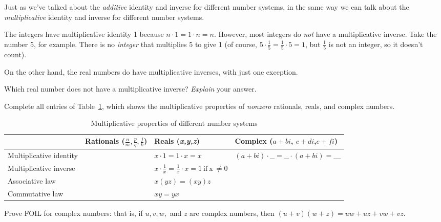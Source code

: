 Just as we've talked about the \emph{additive} identity and inverse
for different number systems, in the same way we can talk about the
\emph{multiplicative} identity and inverse for different number systems.

The integers have multiplicative identity 1 because $n\cdot1=1\cdot n=n$.
However, most integers do \emph{not} have a multiplicative inverse.
Take the number 5, for example. There is no \emph{integer} that multiplies
5 to give 1 (of course, $5\cdot\frac{1}{5}=\frac{1}{5}\cdot5=1$,
but $\frac{1}{5}$ is not an integer, so it doesn't
count).

On the other hand, the real numbers do have multiplicative inverses,
with just one exception.

\begin{exercise}\label{exercise:complex:14}
 Which real number does not
have a multiplicative inverse? \emph{Explain} your answer.
\end{exercise}

\begin{exercise}\label{exercise:complex:15}
Complete all entries of Table~\ref{multiplicative_table}, which shows the multiplicative properties
of \emph{nonzero} rationals, reals, and complex numbers.

\begin{table}[!htb]
\caption{Multiplicative properties of different number systems}\label{multiplicative_table}
\begin{tabular}{|p{2.1cm}|p{2.9cm}|p{2.3 cm}|p{3.5cm}|}
\hline 
\rule{0pt}{2.6ex} & Rationals ($\frac{n}{m},\frac{p}{q},\frac{j}{k}$)  & Reals (\emph{x,y,z})  & Complex ($a+bi$, $c+di$,$e+fi$)\rule[-1.2ex]{0pt}{0pt}\tabularnewline
\hline
\hline 
\rule{0pt}{2.6ex} Multiplicative identity  &  & $x\cdot1=1\cdot x=x$  & $(a+bi)\cdot \_\_= \_\_\cdot(a+bi) = \_\_\_$ \rule[-1.2ex]{0pt}{0pt} \tabularnewline
\hline 
\rule{0pt}{2.6ex} Multiplicative inverse  &  & $x \cdot \frac{1}{x} = \frac{1}{x} \cdot x = 1 \mathrm{~if~x~\neq 0}$  & \rule[-1.2ex]{0pt}{0pt} \tabularnewline
\hline 
\rule{0pt}{2.6ex} Associative law  & & $x(yz) = (xy)z$  & \rule[-1.2ex]{0pt}{0pt} \tabularnewline
\hline 
\rule{0pt}{2.6ex} Commutative law  &  & $xy = yx$ & \rule[-1.2ex]{0pt}{0pt} \tabularnewline
\hline
\end{tabular}
\end{table}
\end{exercise}


\begin{exercise}\label{exercise:complex:complexFOIL}
Prove FOIL for complex numbers: that is, if $u,v,w,$ and $z$ are complex numbers, then $(u+v)(w+z) = uw + uz+vw+vz$.
\end{exercise}

